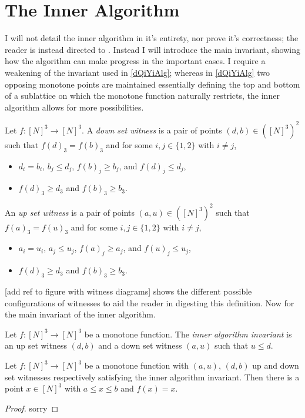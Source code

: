 \section{The Inner Algorithm}
I will not detail the inner algorithm in it's entirety, nor prove it's correctness;
the reader is instead directed to \citep{fasterTarski}. Instead I will introduce
the main invariant, showing how the algorithm can make progress in the important 
cases. I require a weakening of the invariant used in \cref{dQiYiAlg}; whereas
in \cref{dQiYiAlg} two opposing monotone points are maintained essentially
defining the top and bottom of a sublattice on which the monotone function
naturally restricts, the inner algorithm allows for more possibilities.
\begin{definition}
  Let $f : [N]^3 \to [N]^3$. A \emph{down set witness} is a pair of points
  $(d, b) \in ([N]^3)^2$ such that $f(d)_3 = f(b)_3$ and for some $i, j \in \{1, 2\}$
  with $i \neq j$,
  \begin{itemize}
    \item $d_i = b_i$, $b_j \leq d_j$, $f(b)_j \geq b_j$, and $f(d)_j \leq d_j$,
    \item $f(d)_3 \geq d_3$ and $f(b)_3 \geq b_3$.
  \end{itemize}
  An \emph{up set witness} is a pair of points
  $(a, u) \in ([N]^3)^2$ such that $f(a)_3 = f(u)_3$ and for some $i, j \in \{1, 2\}$
  with $i \neq j$,
  \begin{itemize}
    \item $a_i = u_i$, $a_j \leq u_j$, $f(a)_j \geq a_j$, and $f(u)_j \leq u_j$,
    \item $f(d)_3 \geq d_3$ and $f(b)_3 \geq b_3$.
  \end{itemize}
\end{definition}
[add ref to figure with witness diagrams] shows the different possible configurations
of witnesses to aid the reader in digesting this definition.
Now for the main invariant of the inner algorithm.
\begin{definition}
  Let $f : [N]^3 \to [N]^3$ be a monotone function. The \emph{inner algorithm invariant}
  is an up set witness $(d, b)$ and a down set witness $(a, u)$ such that $u \leq d$.
\end{definition}
\begin{prop}
  Let $f : [N]^3 \to [N]^3$ be a monotone function with $(a, u)$, $(d, b)$ up
  and down set witnesses respectively satisfying the inner algorithm invariant.
  Then there is a point $x \in [N]^3$ with $a \leq x \leq b$ and $f(x) = x$.
\end{prop}
\begin{proof}
  sorry
\end{proof}
